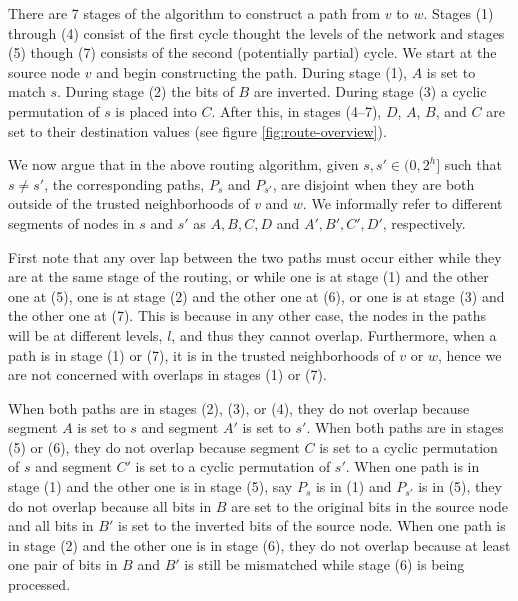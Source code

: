 \documentclass[prodmode,permissions]{acmsmall-ec16}
\begin{document}
There are 7 stages of the algorithm to construct a path from $v$ to $w$. Stages (1) through (4) consist of the first cycle thought the levels of the network and stages (5) though (7) consists of the second (potentially partial) cycle. We start at the source node $v$ and begin constructing the path. During stage (1), $A$ is set to match $s$. During stage (2) the bits of $B$ are inverted. During stage (3) a cyclic permutation of $s$ is placed into $C$. After this, in stages (4--7), $D$, $A$, $B$, and $C$ are set to their destination values (see figure \ref{fig:route-overview}).

We now argue that in the above routing algorithm, given $s, s' \in (0, 2^h]$ such that $s \neq s'$, the corresponding paths, $P_s$ and $P_{s'}$, are disjoint when they are both outside of the trusted neighborhoods of $v$ and $w$. We informally refer to different segments of nodes in $s$ and $s'$ as $A,B,C,D$ and $A',B',C',D'$, respectively. 

First note that any over lap between the two paths must occur either while they are at the same stage of the routing, or while one is at stage (1) and the other one at (5), one is at stage (2) and the other one at (6), or one is at stage (3) and the other one at (7). This is because in any other case, the nodes in the paths will be at different levels, $l$, and thus they cannot overlap. Furthermore, when a path is in stage (1) or (7), it is in the trusted neighborhoods of $v$ or $w$, hence we are not concerned with overlaps in stages (1) or (7). 

When both paths are in stages (2), (3), or (4), they do not overlap because segment $A$ is set to $s$ and segment $A'$ is set to $s'$. When both paths are in stages (5) or (6), they do not overlap because segment $C$ is set to a cyclic permutation of $s$ and segment $C'$ is set to a cyclic permutation of $s'$. When one path is in stage (1) and the other one is in stage (5), say $P_s$ is in (1) and $P_{s'}$ is in (5), they do not overlap because all bits in $B$ are set to the original bits in the source node and all bits in $B'$ is set to the inverted bits of the source node. When one path is in stage (2) and the other one is in stage (6), they do not overlap because at least one pair of bits in $B$ and $B'$ is still be mismatched while stage (6) is being processed. 
\end{document}
